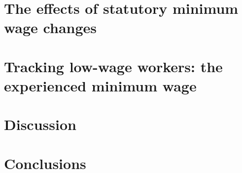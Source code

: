 \documentclass{article}
\begin{document}
\section{The effects of statutory minimum wage changes}\label{sec:results}
    

\section{Tracking low-wage workers: the experienced minimum wage}\label{sec:experienced_mw}
	

\section{Discussion}\label{sec:discussion}
	

\section{Conclusions}\label{sec:conclusion}
    

 


\clearpage
\printbibliography


\clearpage

\section*{}
\vspace{5mm}

\appendix

\renewcommand\thetable{\thesection.\arabic{table}}    
\renewcommand\thefigure{\thesection.\arabic{figure}} 
\setcounter{table}{0}
\setcounter{figure}{0}


\end{document}
